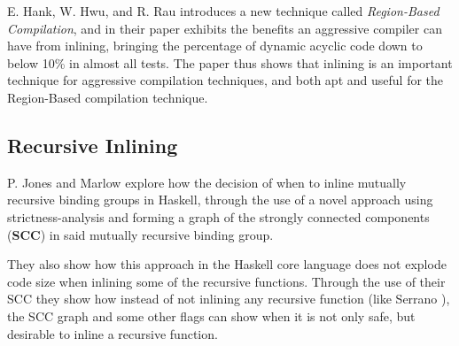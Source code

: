 E. Hank, W. Hwu, and R. Rau \cite{RegionBasedCompilationIntroduction} introduces
a new technique called \textit{Region-Based Compilation}, and in their paper
exhibits the benefits an aggressive compiler can have from inlining, bringing
the percentage of dynamic acyclic code down to below 10\% in almost all tests.
The paper thus shows that inlining is an important technique for aggressive
compilation techniques, and both apt and useful for the Region-Based compilation
technique.

\subsection{Recursive Inlining}

P. Jones and Marlow \cite{GHC-paper} explore how the decision of when to inline
mutually recursive binding groups in Haskell, through the use of a novel
approach using strictness-analysis and forming a graph of the strongly connected
components (\textbf{SCC}) in said mutually recursive binding group.

They also show how this approach in the Haskell core language does not explode
code size when inlining some of the recursive functions. Through the use of
their SCC they show how instead of not inlining any recursive function (like
Serrano \cite{InlineWhenHowSerrano}), the SCC graph and some other flags can
show when it is not only safe, but desirable to inline a recursive function.
